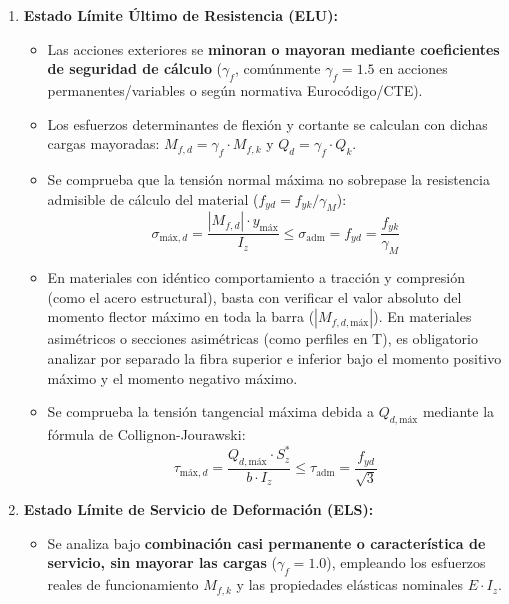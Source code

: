 \begin{enumerate}
    \item \textbf{Estado Límite Último de Resistencia (ELU):}
          \begin{itemize}
              \item Las acciones exteriores se \textbf{minoran o mayoran mediante coeficientes de seguridad de cálculo} ($\gamma_f$, comúnmente $\gamma_f = 1.5$ en acciones permanentes/variables o según normativa Eurocódigo/CTE).
              \item Los esfuerzos determinantes de flexión y cortante se calculan con dichas cargas mayoradas: $M_{f,d} = \gamma_f \cdot M_{f,k}$ y $Q_d = \gamma_f \cdot Q_k$.
              \item Se comprueba que la tensión normal máxima no sobrepase la resistencia admisible de cálculo del material ($f_{yd} = f_{yk}/\gamma_M$):
                    \begin{equation}
                        \sigma_{\text{máx},d} = \frac{|M_{f,d}| \cdot y_{\text{máx}}}{I_z} \le \sigma_{\text{adm}} = f_{yd} = \frac{f_{yk}}{\gamma_M}
                    \end{equation}
              \item En materiales con idéntico comportamiento a tracción y compresión (como el acero estructural), basta con verificar el valor absoluto del momento flector máximo en toda la barra ($|M_{f,d,\text{máx}}|$). En materiales asimétricos o secciones asimétricas (como perfiles en T), es obligatorio analizar por separado la fibra superior e inferior bajo el momento positivo máximo y el momento negativo máximo.
              \item Se comprueba la tensión tangencial máxima debida a $Q_{d,\text{máx}}$ mediante la fórmula de Collignon-Jourawski:
                    \begin{equation}
                        \tau_{\text{máx},d} = \frac{Q_{d,\text{máx}} \cdot S_z^*}{b \cdot I_z} \le \tau_{\text{adm}} = \frac{f_{yd}}{\sqrt{3}}
                    \end{equation}
          \end{itemize}
    \item \textbf{Estado Límite de Servicio de Deformación (ELS):}
          \begin{itemize}
              \item Se analiza bajo \textbf{combinación casi permanente o característica de servicio, sin mayorar las cargas} ($\gamma_f = 1.0$), empleando los esfuerzos reales de funcionamiento $M_{f,k}$ y las propiedades elásticas nominales $E \cdot I_z$.

\end{itemize}
\end{enumerate}
